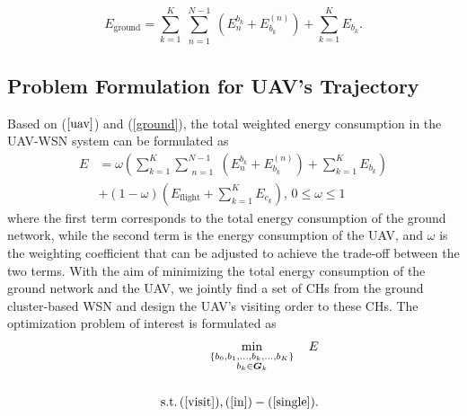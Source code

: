 \documentclass[journal]{IEEEtran}
\begin{document}
	\begin{equation}
	\label{ground}
	E_\text{ground}  =  \sum_{k=1}^{K}\sum_{\substack{n=1}}^{N-1}\left(E^{b_k}_n + E_{b_k}^{(n)}\right) + \sum_{k=1}^{K}E_{b_k}.
	\end{equation}
	
	
		
	
	
	\subsection{Problem Formulation for UAV's Trajectory}
	Based on ($\ref{uav}$) and (\ref{ground}), the total weighted energy consumption in the UAV-WSN system can be formulated as
	\begin{align}
	\label{eq19}
	    E
		&=\omega \left(\sum_{k=1}^{K}\sum_{\substack{n=1}}^{N-1}\left(E^{b_k}_n + E_{b_k}^{(n)}\right) + \sum_{k=1}^{K}E_{b_k}\right) \nonumber \\
		&+ (1-\omega) \left(E_{\text{flight}} + \sum_{k=1}^{K}E_{c_k}\right), \,0 \leq \omega \leq 1
	\end{align}
	where the first term corresponds to the total energy consumption of the ground network, while the second term is the energy consumption of the UAV, and $\omega$ is the weighting coefficient that can be adjusted to achieve the trade-off between the two terms. With the aim of minimizing the total energy consumption of the ground network and the UAV, we jointly find a set of CHs from the ground cluster-based WSN and design the UAV's visiting order to these CHs. The optimization problem of interest is formulated as
	\begin{eqnarray}
	\label{objectivefunction}
	&&\min_{\substack{\{b_0,b_1,\dots,b_k,\dots, b_K\}\\ b_k\in \bm{G}_{k}}} \quad  E \nonumber\\
	\\
	&&\text{s.t.} \, (\ref{visit}), (\ref{in})-(\ref{single}).\nonumber
	\end{eqnarray}
	
\end{document}
